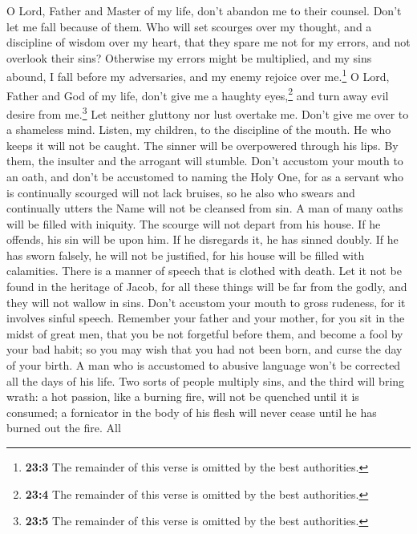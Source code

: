  O Lord, Father and Master of my life, don't abandon me to
their counsel. Don't let me fall because of them.  Who
will set scourges over my thought, and a discipline of wisdom over my
heart, that they spare me not for my errors, and not overlook their
sins?  Otherwise my errors might be multiplied, and my
sins abound, I fall before my adversaries, and my enemy rejoice over
me.\footnote{\textbf{23:3} The remainder of this verse is omitted by the
  best authorities.}  O Lord, Father and God of my life,
don't give me a haughty eyes,\footnote{\textbf{23:4} The remainder of
  this verse is omitted by the best authorities.}  and
turn away evil desire from me.\footnote{\textbf{23:5} The remainder of
  this verse is omitted by the best authorities.}  Let
neither gluttony nor lust overtake me. Don't give me over to a shameless
mind.  Listen, my children, to the discipline of the
mouth. He who keeps it will not be caught.  The sinner
will be overpowered through his lips. By them, the insulter and the
arrogant will stumble.  Don't accustom your mouth to an
oath, and don't be accustomed to naming the Holy One, 
for as a servant who is continually scourged will not lack bruises, so
he also who swears and continually utters the Name will not be cleansed
from sin.  A man of many oaths will be filled with
iniquity. The scourge will not depart from his house. If he offends, his
sin will be upon him. If he disregards it, he has sinned doubly. If he
has sworn falsely, he will not be justified, for his house will be
filled with calamities.  There is a manner of speech that
is clothed with death. Let it not be found in the heritage of Jacob, for
all these things will be far from the godly, and they will not wallow in
sins.  Don't accustom your mouth to gross rudeness, for
it involves sinful speech.  Remember your father and your
mother, for you sit in the midst of great men, that you be not forgetful
before them, and become a fool by your bad habit; so you may wish that
you had not been born, and curse the day of your birth. 
A man who is accustomed to abusive language won't be corrected all the
days of his life.  Two sorts of people multiply sins, and
the third will bring wrath: a hot passion, like a burning fire, will not
be quenched until it is consumed; a fornicator in the body of his flesh
will never cease until he has burned out the fire.  All
